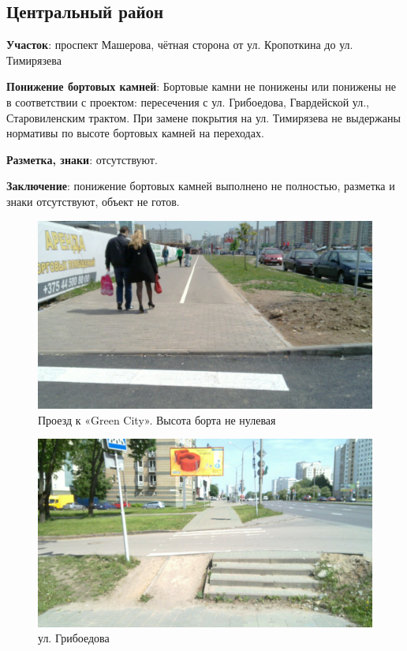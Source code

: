 \documentclass[a4paper,14pt,twoside]{extarticle}
\renewcommand\emph[1]{\textbf{#1}}
\begin{document}
\clearpage
\newpage

\subsection*{Центральный район}
\emph{Участок}: проспект Машерова, чётная сторона от ул. Кропоткина до ул. Тимирязева

\emph{Понижение бортовых камней}: Бортовые камни не понижены или понижены не в соответствии с проектом: пересечения с ул. Грибоедова, Гвардейской ул., Старовиленским трактом. При замене покрытия на ул. Тимирязева не выдержаны нормативы по высоте бортовых камней на переходах.

\emph{Разметка, знаки}: отсутствуют.

\emph{Заключение}: понижение бортовых камней выполнено не полностью, разметка и знаки отсутствуют, объект не готов.

\begin{figure}[hb!]
        \centering
        \includegraphics[width=\textwidth]{Pictures/1000000000000A00000005A062A3E4CA.jpg}
        \caption{Проезд к «Green City». Высота борта не нулевая}
\end{figure}

\begin{figure}[h!]
    \centering
    \includegraphics[width=\textwidth]{Pictures/1000000000000A00000005A0B4C7E123.jpg}
    \caption{ул. Грибоедова}
\end{figure}
\end{document}

